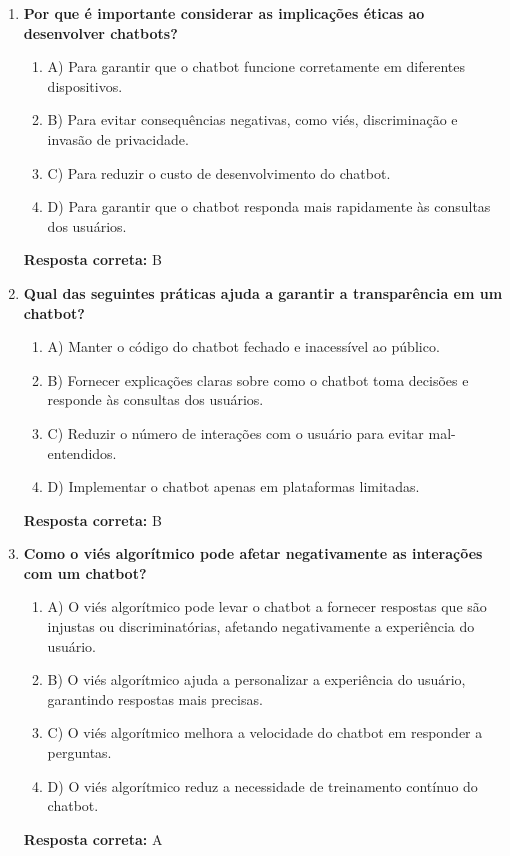 \documentclass[14pt,a4paper,oneside]{book}
\begin{document}
\begin{enumerate}
	
	\item \textbf{Por que é importante considerar as implicações éticas ao desenvolver chatbots?}
	\begin{enumerate}[label=\alph*)]
		\item A) Para garantir que o chatbot funcione corretamente em diferentes dispositivos.
		\item B) Para evitar consequências negativas, como viés, discriminação e invasão de privacidade.
		\item C) Para reduzir o custo de desenvolvimento do chatbot.
		\item D) Para garantir que o chatbot responda mais rapidamente às consultas dos usuários.
	\end{enumerate}
	\vspace{5mm}
	\textbf{Resposta correta:} B
	
	\item \textbf{Qual das seguintes práticas ajuda a garantir a transparência em um chatbot?}
	\begin{enumerate}[label=\alph*)]
		\item A) Manter o código do chatbot fechado e inacessível ao público.
		\item B) Fornecer explicações claras sobre como o chatbot toma decisões e responde às consultas dos usuários.
		\item C) Reduzir o número de interações com o usuário para evitar mal-entendidos.
		\item D) Implementar o chatbot apenas em plataformas limitadas.
	\end{enumerate}
	\vspace{5mm}
	\textbf{Resposta correta:} B
	
	\item \textbf{Como o viés algorítmico pode afetar negativamente as interações com um chatbot?}
	\begin{enumerate}[label=\alph*)]
		\item A) O viés algorítmico pode levar o chatbot a fornecer respostas que são injustas ou discriminatórias, afetando negativamente a experiência do usuário.
		\item B) O viés algorítmico ajuda a personalizar a experiência do usuário, garantindo respostas mais precisas.
		\item C) O viés algorítmico melhora a velocidade do chatbot em responder a perguntas.
		\item D) O viés algorítmico reduz a necessidade de treinamento contínuo do chatbot.
	\end{enumerate}
	\vspace{5mm}
	\textbf{Resposta correta:} A
	

\end{enumerate}
\end{document}
